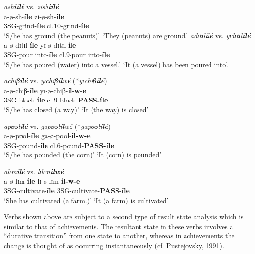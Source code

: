 \documentclass[output=paper,newtxmath,modfonts,nonflat,draftmode]{langsci/langscibook}
\begin{document}
\ea \label{ex:kanijo:28}
\ea
\glll  *\textit{ash}\textbf{\textit{iílé}}       vs.  \textit{zish}\textbf{\textit{iílé}}\\
\textbf{ }a-ø-sh-\textbf{íle}         zi-ø-sh-\textbf{íle}\\
 3SG-grind-\textbf{íle}      cl.10-grind-\textbf{íle}\\
 \glt ‘S/he has ground (the peanuts)’  ‘They (peanuts) are ground.’
\ex \glll *\textit{adɪ}\textit{tɪ}\textit{l}\textbf{\textit{ílé}}       vs.  \textit{yɪ}\textit{dɪ}\textit{tɪ}\textit{l}\textbf{\textit{ílé}}\\
a-ø-dɪtɪl-\textbf{íle}      yɪ-ø-dɪtɪl-\textbf{íle}\\
3SG-pour into-\textbf{íle}    cl.9-pour into-\textbf{íle}\\
\glt ‘S/he has poured (water) into a vessel.’  ‘It (a vessel) has been poured into’.

\ex \glll \textit{achiβ}\textbf{\textit{ílé}}      vs.  \textit{y}\textit{ɪchiβ}\textbf{\textit{íl}}\textit{w}\textbf{\textit{é}} (*\textit{yɪ}\textit{chiβ}\textbf{\textit{ílé}})\\
    a-ø-chiβ-\textbf{íle}      yɪ-ø-chiβ-\textbf{íl}-\textbf{w}-\textbf{e}\\
    3SG-block-\textbf{íle}      cl.9-block-\textbf{PASS-íle}\\
    \glt ‘S/he has closed (a way)’  ‘It (the way) is closed’

\ex \glll *\textit{ap}\textit{ʊʊl}\textbf{\textit{ílé}}       vs.  \textit{gap}\textit{ʊʊl}\textbf{\textit{íl}}\textit{w}\textbf{\textit{é}} (*\textit{gap}\textit{ʊʊl}\textbf{\textit{ílé}})\\
    a-ø-pʊʊl-\textbf{íle}      ga-ø-pʊʊl-\textbf{íl-w-e}\\
    3SG-pound-\textbf{íle}      cl.6-pound-\textbf{PASS-íle}\\
\glt     ‘S/he has pounded (the corn)’  ‘It (corn) is pounded’

\ex \glll *\textit{alɪ}\textit{m}\textbf{\textit{ilé}}      vs.  \textit{lɪ}\textit{lɪ}\textit{m}\textbf{\textit{ilwé}}\\
a-ø-lɪm-\textbf{íle}        lɪ-ø-lɪm-\textbf{íl-w-e}\\
3SG-cultivate-\textbf{íle}      3SG-cultivate-\textbf{PASS}-\textbf{íle}\\
\glt ‘She has cultivated (a farm.)’  ‘It (a farm) is cultivated’
\z
\z

Verbs shown above are subject to a second type of result state analysis which is similar to that of achievements. The resultant state in these verbs involves a “durative transition” from one state to another, whereas in achievements the change is thought of as occurring instantaneously (cf. Pustejovsky, 1991).
\end{document}
